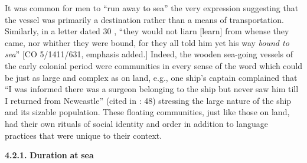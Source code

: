 It was common for men to “run away to sea” \citep[67,]{Jarvis2010} the very expression suggesting that the vessel was primarily a destination rather than a means of transportation. Similarly, in a letter dated 30 \citealt{July1699}, “they would not liarn [learn] from whense they came, nor whither they were bound, for they all told him yet his way \textit{bound to sea}” [CO 5/1411/631, emphasis added.] Indeed, the wooden sea-going vessels of the early colonial period were communities in every sense of the word which could be just as large and complex as on land, e.g., one ship’s captain complained that “I was informed there was a surgeon belonging to the ship but never saw him till I returned from Newcastle” (cited in \citealt{Brown2011}: 48) stressing the large nature of the ship and its sizable population. These floating communities, just like those on land, had their own rituals of social identity and order in addition to language practices that were unique to their context.

  \textbf{4.2.1.} \textbf{Duration} \textbf{at} \textbf{sea}

